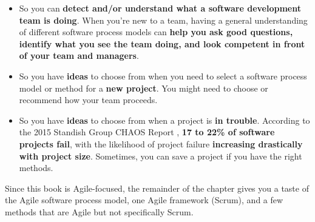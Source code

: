 \begin{itemize}

\item {}So you can \textbf{detect and/or understand what a software development team is doing}. When you're new to a team, having a general understanding of different software process models can \textbf{help you ask good questions, identify what you see the team doing, and look competent in front of your team and managers}.\\

\item So you have \textbf{ideas} to choose from when you need to select a software process model or method for a \textbf{new project}. You might need to choose or recommend how your team proceeds.\\

\item So you have \textbf{ideas} to choose from when a project is \textbf{in trouble}. According to the 2015 Standish Group CHAOS Report \parencite{standish2015chaos}, \textbf{17 to 22\% of software projects fail}, with the likelihood of project failure \textbf{increasing drastically with project size}. Sometimes, you can save a project if you have the right methods.\\

\end{itemize}

Since this book is Agile-focused, the remainder of the chapter gives you a taste of the Agile software process model, one Agile framework (Scrum), and a few methods that are Agile but not specifically Scrum.

\nomargins
